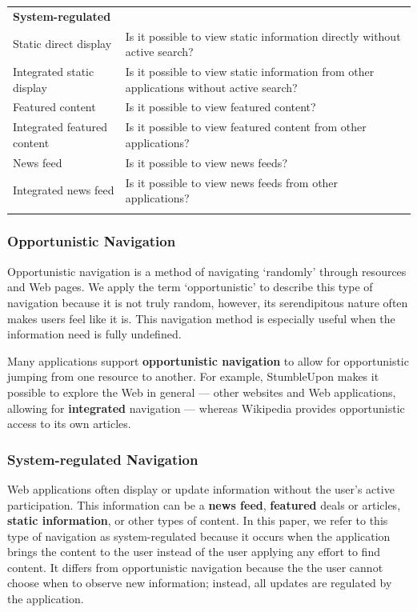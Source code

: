 \documentclass{sigchi}
\begin{document}
{{{\begin{table}[ht!]
\begin{tabular}{|p{}| p{}|}
\textbf{System-regulated}            		& \\
Static direct display           & Is it possible to view static information directly without active search? \\
Integrated static display   	& Is it possible to view static information from other applications without active search? \\
Featured content             	& Is it possible to view featured content? \\
Integrated featured content     & Is it possible to view featured content from other applications? \\
News feed             			& Is it possible to view news feeds? \\
Integrated news feed            & Is it possible to view news feeds from other applications? \\
&\\
\hline
\end{tabular}
\end{table}

{\subsubsection{Opportunistic Navigation}
Opportunistic navigation is a method of navigating `randomly' through resources and Web pages. We apply the term `opportunistic' to describe this type of navigation because it is not truly random, however, its serendipitous nature often makes users feel like it is. This navigation method is especially useful when the information need is fully undefined.

Many applications support \textbf{opportunistic navigation} to allow for opportunistic jumping from one resource to another. For example, StumbleUpon makes it possible to explore the Web in general --- other websites and Web applications, allowing for \textbf{integrated} navigation --- whereas Wikipedia provides opportunistic access to its own articles. 
} %


{\subsubsection{System-regulated Navigation}
Web applications often display or update information without the user's active participation. This information can be a \textbf{news feed}, \textbf{featured} deals or articles, \textbf{static information}, or other types of content. In this paper, we refer to this type of navigation as system-regulated because it occurs when the application brings the content to the user instead of the user applying any effort to find content. It differs from opportunistic navigation because the the user cannot choose when to observe new information; instead, all updates are regulated by the application. 

}}}}
\end{document}
